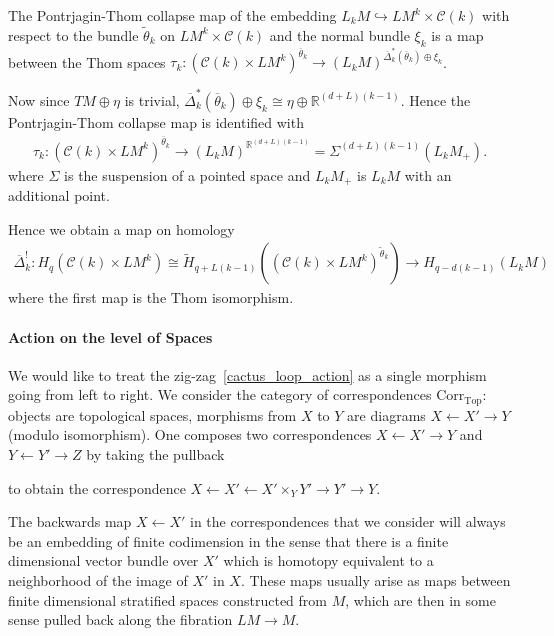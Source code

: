 \documentclass{scrartcl}
\theoremstyle{plain}
\theoremstyle{definition}
\newcommand{\R}{\mathbb{R}}
\begin{document}
The Pontrjagin-Thom collapse map of the embedding $L_kM\hookrightarrow LM^k\times \mathcal C(k)$ with respect to the bundle $\tilde\theta_k$ on $LM^k\times \mathcal C(k)$ and the normal bundle $\xi_k$ is a map between the Thom spaces $\tau_k \colon (\mathcal C(k) \times LM^k)^{\overline\theta_k} \to (L_kM)^{\overline\Delta_k^*(\overline\theta_k)\oplus \xi_k}$. 

Now since $TM\oplus\eta$ is trivial, $\overline\Delta_k^*(\overline\theta_k) \oplus \xi_k\cong \eta\oplus \R^{(d+L)(k-1)}$. Hence the Pontrjagin-Thom collapse map is identified with 
\begin{align*}
    \tau_k \colon (\mathcal C(k) \times LM^k)^{\overline\theta_k} \to (L_kM)^{\R^{(d+L)(k-1)}} = \Sigma^{(d+L)(k-1)}(L_kM_+).
\end{align*}
where $\Sigma$ is the suspension of a pointed space and $L_kM_+$ is $L_kM$ with an additional point. 

Hence we obtain a map on homology
\begin{align*}
    \overline{\Delta}_{k}^! \colon H_q(\mathcal C(k)\times LM^k) \cong \tilde H_{q+L(k-1)}((\mathcal C(k)\times LM^k)^{\tilde\theta_k}) \to H_{q-d(k-1)}(L_kM)
\end{align*}
where the first map is the Thom isomorphism. 

\paragraph{Action on the level of Spaces} We would like to treat the zig-zag~\eqref{cactus_loop_action} as a single morphism going from left to right. We consider the category of correspondences $\mathrm{Corr}_\mathrm{Top}$: objects are topological spaces, morphisms from $X$ to $Y$ are diagrams $X \leftarrow X' \rightarrow Y$ (modulo isomorphism). One composes two correspondences $X \leftarrow X' \rightarrow Y$ and $Y \leftarrow Y' \rightarrow Z$ by taking the pullback 
\begin{center}
\end{center}
to obtain the correspondence $X \leftarrow X' \leftarrow X'\times_Y Y' \to Y' \to Y$. 

The backwards map $X\leftarrow X'$ in the correspondences that we consider will always be an embedding of finite codimension in the sense that there is a finite dimensional vector bundle over $X'$ which is homotopy equivalent to a neighborhood of the image of $X'$ in $X$. These maps usually arise as maps between finite dimensional stratified spaces constructed from $M$, which are then in some sense pulled back along the fibration $LM\to M$. 
\end{document}
